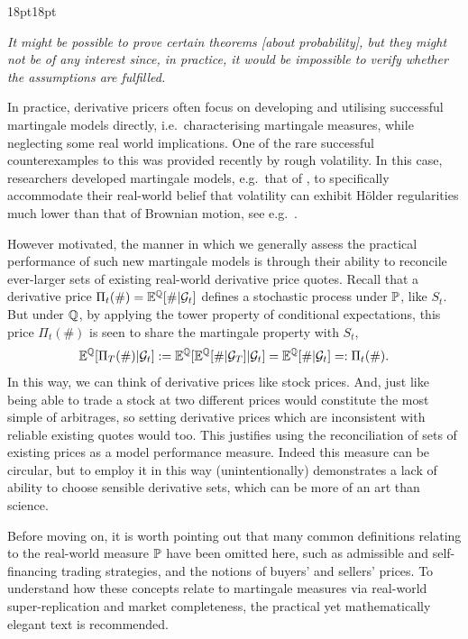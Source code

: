 \vspace{-6mm}
\begin{adjustwidth}{18pt}{18pt}
\begin{remark}\label{rem:borel}
    \emph{It might be possible to prove certain theorems [about probability], but they might not be of any interest since, in practice, it would be impossible to verify whether the assumptions are fulfilled.}
\end{remark}
\end{adjustwidth}

\vspace{2mm}

In practice, derivative pricers often focus on developing and utilising successful martingale models directly, i.e.~characterising martingale measures, while neglecting some real world implications. One of the rare successful counterexamples to this was provided recently by rough volatility. In this case, researchers developed martingale models, e.g.~that of \cite{bayer_2016}, to specifically accommodate their real-world belief that volatility can exhibit H\"older regularities much lower than that of Brownian motion, see e.g.~\cite{gatheral_2020}.

However motivated, the manner in which we generally assess the practical performance of such new martingale models is through their ability to reconcile ever-larger sets of existing real-world derivative price quotes. Recall that a derivative price $\Pi_t(\#)=\mathbb{E}^{\mathbb{Q}}[\#|\mathcal{G}_t]$ defines a stochastic process under $\mathbb{P}$, like $S_t$. But under $\mathbb{Q}$, by applying the tower property of conditional expectations, this price $\Pi_t(\#)$ is seen to share the martingale property with $S_t$,
\begin{equation}
    \mathbb{E}^{\mathbb{Q}}[\Pi_T(\#)|\mathcal{G}_t] := \mathbb{E}^{\mathbb{Q}}[\mathbb{E}^{\mathbb{Q}}[\#|\mathcal{G}_T]|\mathcal{G}_t] = \mathbb{E}^{\mathbb{Q}}[\#|\mathcal{G}_t] =: \Pi_t(\#).
\end{equation}
In this way, we can think of derivative prices like stock prices. And, just like being able to trade a stock at two different prices would constitute the most simple of arbitrages, so setting derivative prices which are inconsistent with reliable existing quotes would too. This justifies using the reconciliation of sets of existing prices as a model performance measure. Indeed this measure can be circular, but to employ it in this way (unintentionally) demonstrates a lack of ability to choose sensible derivative sets, which can be more of an art than science.

Before moving on, it is worth pointing out that many common definitions relating to the real-world measure $\mathbb{P}$ have been omitted here, such as admissible and self-financing trading strategies, and the notions of buyers' and sellers' prices. To understand how these concepts relate to martingale measures via real-world super-replication and market completeness, the practical yet mathematically elegant text \cite{guyon_2013} is recommended.

